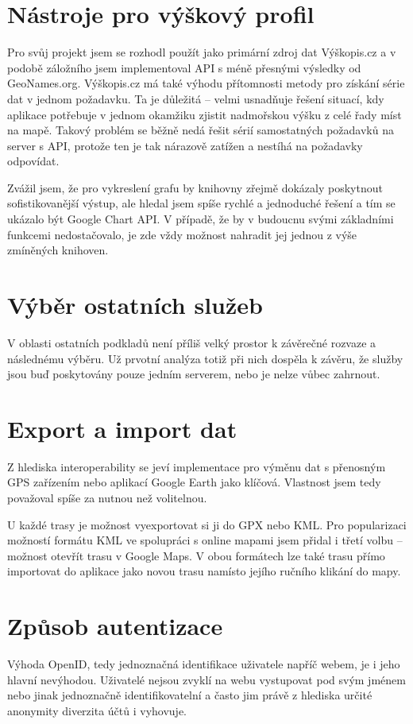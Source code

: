 \section{Nástroje pro výškový profil}
Pro svůj projekt jsem se rozhodl použít jako primární zdroj dat
Výškopis.cz a v podobě záložního jsem implementoval API s méně
přesnými výsledky od GeoNames.org. Výškopis.cz má také výhodu
přítomnosti metody pro získání série dat v jednom požadavku. Ta je
důležitá -- velmi usnadňuje řešení situací, kdy aplikace potřebuje v
jednom okamžiku zjistit nadmořskou výšku z celé řady míst na mapě.
Takový problém se běžně nedá řešit sérií samostatných požadavků na
server s API, protože ten je tak nárazově zatížen a nestíhá na
požadavky odpovídat.

Zvážil jsem, že pro vykreslení grafu by knihovny zřejmě dokázaly
poskytnout sofistikovanější výstup, ale hledal jsem spíše rychlé a
jednoduché řešení a tím se ukázalo být Google Chart API. V případě,
že by v budoucnu svými základními funkcemi nedostačovalo, je zde vždy
možnost nahradit jej jednou z výše zmíněných knihoven.

\section{Výběr ostatních služeb}
V oblasti ostatních podkladů není příliš velký prostor k
závěrečné rozvaze a následnému výběru. Už prvotní analýza totiž při
nich dospěla k závěru, že služby jsou buď poskytovány pouze jedním
serverem, nebo je nelze vůbec zahrnout.

\section{Export a import dat}
Z hlediska interoperability se jeví implementace pro výměnu
dat s přenosným GPS zařízením nebo aplikací Google Earth jako
klíčová. Vlastnost jsem tedy považoval spíše za nutnou než volitelnou.

U každé trasy je možnost vyexportovat si ji do GPX nebo KML. Pro
popularizaci možností formátu KML ve spolupráci s online mapami jsem
přidal i třetí volbu -- možnost otevřít trasu v Google Maps. V obou
formátech lze také trasu přímo importovat do aplikace jako novou trasu
namísto jejího ručního klikání do mapy.

\section{Způsob autentizace}
Výhoda OpenID, tedy jednoznačná identifikace uživatele napříč webem,
je i jeho hlavní nevýhodou. Uživatelé nejsou zvyklí na webu
vystupovat pod svým jménem nebo jinak jednoznačně identifikovatelní a
často jim právě z hlediska určité anonymity diverzita účtů i vyhovuje.

